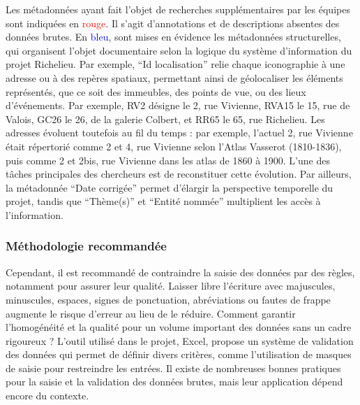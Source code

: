 Les métadonnées ayant fait l'objet de recherches supplémentaires par les équipes sont indiquées en \textcolor{red}{rouge}. Il s'agit d'annotations et de descriptions absentes des données brutes. En \textcolor{blue}{bleu}, sont mises en évidence les métadonnées structurelles, qui organisent l'objet documentaire selon la logique du système d'information du projet Richelieu. Par exemple, \enquote{Id localisation} relie chaque iconographie à une adresse ou à des repères spatiaux, permettant ainsi de géolocaliser les éléments représentés, que ce soit des immeubles, des points de vue, ou des lieux d'événements. Par exemple, RV2 désigne le 2, rue Vivienne, RVA15 le 15, rue de Valois, GC26 le 26, de la galerie Colbert, et RR65 le 65, rue Richelieu. Les adresses évoluent toutefois au fil du temps : par exemple, l'actuel 2, rue Vivienne était répertorié comme 2 et 4, rue Vivienne selon l’Atlas Vasserot (1810-1836), puis comme 2 et 2bis, rue Vivienne dans les atlas de 1860 à 1900. L'une des tâches principales des chercheurs est de reconstituer cette évolution. Par ailleurs, la métadonnée \enquote{Date corrigée} permet d'élargir la perspective temporelle du projet, tandis que \enquote{Thème(s)} et \enquote{Entité nommée} multiplient les accès à l'information.


\subsubsection{Méthodologie recommandée}
Cependant, il est recommandé de contraindre la saisie des données par des règles, notamment pour assurer leur qualité. Laisser libre l'écriture avec majuscules, minuscules, espaces, signes de ponctuation, abréviations ou fautes de frappe augmente le risque d'erreur au lieu de le réduire. Comment garantir l'homogénéité et la qualité pour un volume important des données sans un cadre rigoureux ? L'outil utilisé dans le projet, Excel, propose un système de validation des données qui permet de définir divers critères, comme l'utilisation de masques de saisie pour restreindre les entrées. Il existe de nombreuses bonnes pratiques pour la saisie et la validation des données brutes, mais leur application dépend encore du contexte.

